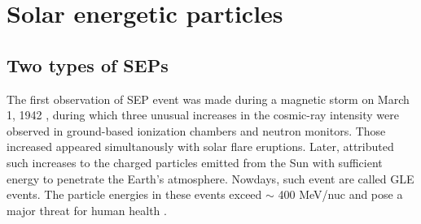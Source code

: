 

\label{chp:background}

\section{Solar energetic particles}

\subsection{Two types of SEPs}


The first observation of \ac{SEP} event was made during a magnetic storm on March 1, 1942 \citep{lange1942note,forbush1942further}, during which three unusual increases in the cosmic-ray intensity were observed in ground-based ionization chambers and neutron monitors. Those increased appeared simultanously with solar flare eruptions. Later, \citet{Forbush1946} attributed such increases to the charged particles emitted from the Sun with sufficient energy to penetrate the Earth's atmosphere. Nowdays, such event are called \ac{GLE} events. The particle energies in these events exceed $\sim$ 400 MeV/nuc and pose a major threat for human health \citep{meyer1956solar,Shea2012SSRv,gopalswamy2013first,thakur2014ground, Reames2013, Mironshnichenko2013Ge}.

